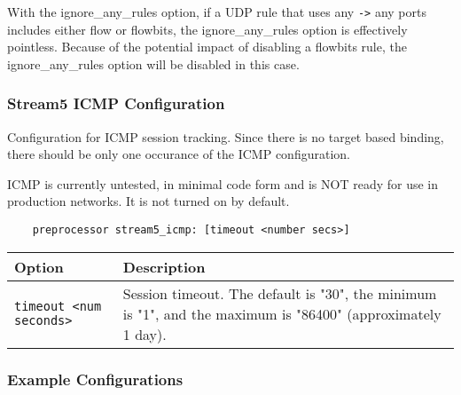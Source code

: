 \documentclass[english]{report}
\newenvironment{note}{
\samepage
    \vspace{10pt}{\textsf{
        {\hspace{7pt}\Huge{$\triangle$\hspace{-12.5pt}{\Large{$^!$}}}}\hspace{5pt}
        {\Large{NOTE}}
    }
    }
   \begin{center}
    \par\vspace{-17pt}

    \begin{lrbox}{\savepar}
    \begin{minipage}[r]{6in}
}
{
    \end{minipage}
    \end{lrbox}
    \fbox{
        \usebox{
            \savepar
	}
    }
    \par\vskip10pt
    \end{center}
}
\newenvironment{note}{
        \begin{rawhtml}
        <p><table border="1"><tr><td><b>
        Note:&nbsp;&nbsp;</b>
        \end{rawhtml}
}{
        \begin{rawhtml}
        </b></td></tr></table></p>
        \end{rawhtml}
}
\begin{document}
\begin{note}

With the ignore\_any\_rules option, if a UDP rule that uses any \texttt{->} any
ports includes either flow or flowbits, the ignore\_any\_rules option is
effectively pointless.  Because of the potential impact of disabling a flowbits
rule, the ignore\_any\_rules option will be disabled in this case.

\end{note}

\subsubsection{Stream5 ICMP Configuration}

Configuration for ICMP session tracking.  Since there is no target based
binding, there should be only one occurance of the ICMP configuration.

\begin{note}

ICMP is currently untested, in minimal code form and is NOT ready for use in
production networks.  It is not turned on by default.

\end{note}

\begin{verbatim}
    preprocessor stream5_icmp: [timeout <number secs>]
\end{verbatim}

\begin{center}
\begin{tabular}{| l | p{4.5in} |}

\hline
\textbf{Option} & \textbf{Description}\\
\hline 

\hline 
\texttt{timeout <num seconds>} &

Session timeout.  The default is "30", the minimum is "1", and the maximum is
"86400" (approximately 1 day).\\

\hline
\end{tabular}
\end{center}

\subsubsection{Example Configurations}
\end{document}
